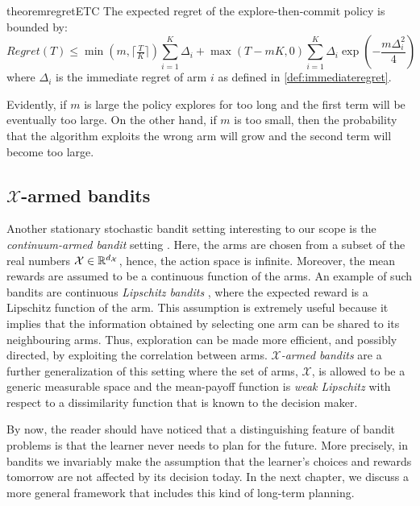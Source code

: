 \begin{restatable}{theorem}{regretETC}\label{th:regretETC}\cite{lattimore2019bandit}
The expected regret of the explore-then-commit policy is bounded by:
\begin{equation}
Regret(T) \leq \min\left(m, \lceil\tfrac{T}{K}\rceil\right)\sum_{i=1}^{K}\Delta_i+\max\left(T-mK, 0\right)\sum_{i=1}^{K}\Delta_i\exp\left(-\frac{m\Delta_i^2}{4}\right)
\end{equation}
where $\Delta_i$ is the immediate regret of arm $i$ as defined in \ref{def:immediateregret}.
\end{restatable}

Evidently, if $m$ is large  the policy explores for too long and the first term will be eventually too large. On the other hand, if $m$ is too small, then the probability that the algorithm exploits the wrong arm will grow and the second term will become too large.

\subsection{$\mathcal{X}$-armed bandits} \label{sub:xarmedbandits}
Another stationary stochastic bandit setting interesting to our scope is the \emph{continuum-armed bandit} setting \cite{agrawal1995continuum}. Here, the arms are chosen from a subset of the real numbers $\mathcal{X}\in\mathbb{R}^{d_{\mathcal{X}}} $, hence, the action space is infinite. Moreover, the mean rewards are assumed to be a continuous function of the arms. An example of such bandits are continuous \emph{Lipschitz bandits} \cite{magureanu2014lipschitz}, where the expected reward is a Lipschitz function of the arm. This assumption is extremely useful because it implies that the information obtained by selecting one arm can be shared to its neighbouring arms. Thus, exploration can be made more efficient, and possibly directed, by exploiting the correlation between arms. \emph{$\mathcal{X}$-armed bandits} \cite{bubeck2011x} are a further generalization of this setting where the set of arms, $\mathcal{X}$, is allowed to be a generic measurable space and the mean-payoff function is \emph{weak Lipschitz} with respect to a dissimilarity function that is known to the decision maker.


By now, the reader should have noticed that a distinguishing feature of bandit problems is that the learner never needs to plan for the future. More precisely, in bandits we invariably make the assumption that the learner’s choices and rewards tomorrow are not affected by its decision today. In the next chapter, we discuss a more general framework that includes this kind of long-term planning.

